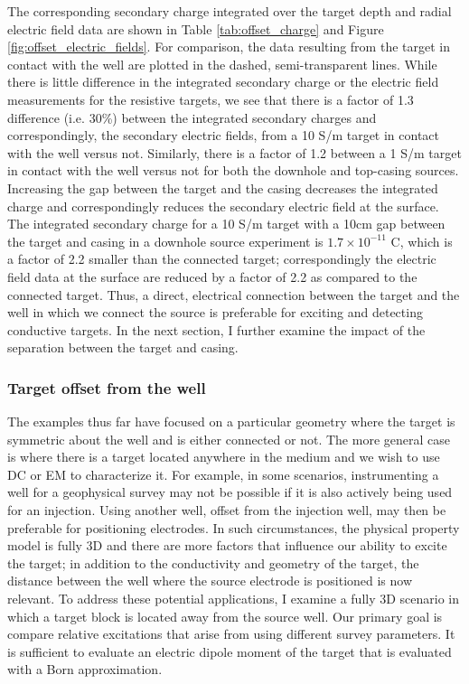 

The corresponding secondary charge integrated over the target depth and radial electric field data are shown in Table \ref{tab:offset_charge} and Figure \ref{fig:offset_electric_fields}. For comparison, the data resulting from the target in contact with the well are plotted in the dashed, semi-transparent lines. While there is little difference in the integrated secondary charge or the electric field measurements for the resistive targets, we see that there is a factor of 1.3 difference (i.e. 30\%) between the integrated secondary charges and correspondingly, the secondary electric fields, from a 10 S/m target in contact with the well versus not. Similarly, there is a factor of 1.2 between a 1 S/m target in contact with the well versus not for both the downhole and top-casing sources. Increasing the gap between the target and the casing decreases the integrated charge and correspondingly reduces the secondary electric field at the surface. The integrated secondary charge for a 10 S/m target with a 10cm gap between the target and casing in a downhole source experiment is $1.7 \times 10^{-11}$ C, which is a factor of 2.2 smaller than the connected target; correspondingly the electric field data at the surface are reduced by a factor of 2.2 as compared to the connected target. Thus, a direct, electrical connection between the target and the well in which we connect the source is preferable for exciting and detecting conductive targets. In the next section, I further examine the impact of the separation between the target and casing.








\subsubsection{Target offset from the well}

The examples thus far have focused on a particular geometry where the target is symmetric about the well and is either connected or not. The more general case is where there is a target located anywhere in the medium and we wish to use DC or EM to characterize it. For example, in some scenarios, instrumenting a well for a geophysical survey may not be possible if it is also actively being used for an injection. Using another well, offset from the injection well, may then be preferable for positioning electrodes. In such circumstances, the physical property model is fully 3D and there are more factors that influence our ability to excite the target; in addition to the conductivity and geometry of the target, the distance between the well where the source electrode is positioned is now relevant. To address these potential applications, I examine a fully 3D scenario in which a target block is located away from the source well. Our primary goal is compare relative excitations that arise from using different survey parameters. It is sufficient to evaluate an electric dipole moment of the target that is evaluated with a Born approximation.

